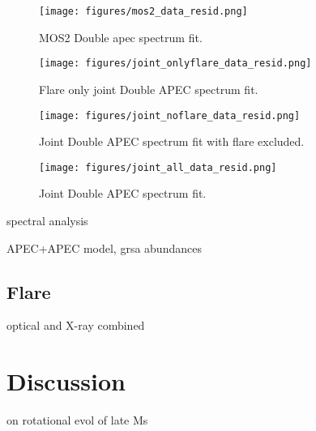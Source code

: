 \documentclass[twocolumn]{aastex631}
\begin{document}
\begin{figure}
    \begin{centering}
        \texttt{[image: figures/mos2\_data\_resid.png]}
        \caption{
         MOS2 Double apec spectrum fit.
        }
        \label{fig:spec_mos2}
    \end{centering}
\end{figure}

\begin{figure}
    \begin{centering}
        \texttt{[image: figures/joint\_onlyflare\_data\_resid.png]}
        \caption{
         Flare only joint Double APEC spectrum fit.
        }
        \label{fig:spec_joint_onlyflare}
    \end{centering}
\end{figure}


\begin{figure}
    \begin{centering}
        \texttt{[image: figures/joint\_noflare\_data\_resid.png]}
        \caption{
         Joint Double APEC spectrum fit with flare excluded.
        }
        \label{fig:spec_joint_noflare}
    \end{centering}
\end{figure}

\begin{figure}
    \begin{centering}
        \texttt{[image: figures/joint\_all\_data\_resid.png]}
        \caption{
         Joint Double APEC spectrum fit.
        }
        \label{fig:spec_joint_all}
    \end{centering}
\end{figure}


spectral analysis

APEC+APEC model, grsa abundances

\subsection{Flare}

optical and X-ray combined

\section{Discussion}
\citep{pass2022constraints} on rotational evol of late Ms
\end{document}
